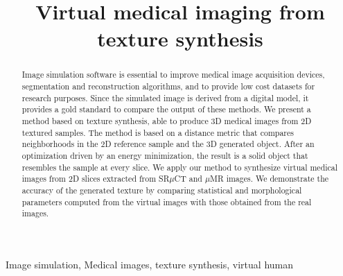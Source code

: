 \documentclass{article}
\title{Virtual medical imaging from texture synthesis}
\begin{document}
%
\maketitle
%
\begin{abstract}
%
Image simulation software is essential to improve medical image acquisition devices, segmentation and reconstruction algorithms,
and to provide low cost datasets for research purposes. Since the simulated image is derived from a digital model, it provides
a gold standard to compare the output of these methods.
We present a method based on texture synthesis, able to produce 3D medical images from 2D textured samples.
The method is based on a distance metric that compares neighborhoods in the 2D reference sample and the 3D generated object. 
After an optimization driven by an energy minimization, the result is a solid object that resembles the sample at every slice.
We apply our method to synthesize virtual medical images from 2D slices extracted from SR$\mu$CT and $\mu$MR images. 
We demonstrate the accuracy of the generated texture by comparing statistical and morphological parameters computed 
from the virtual images with those obtained from the real images. 

\end{abstract}
%
\begin{keywords}
Image simulation, Medical images, texture synthesis, virtual human
\end{keywords}
%
\end{document}
